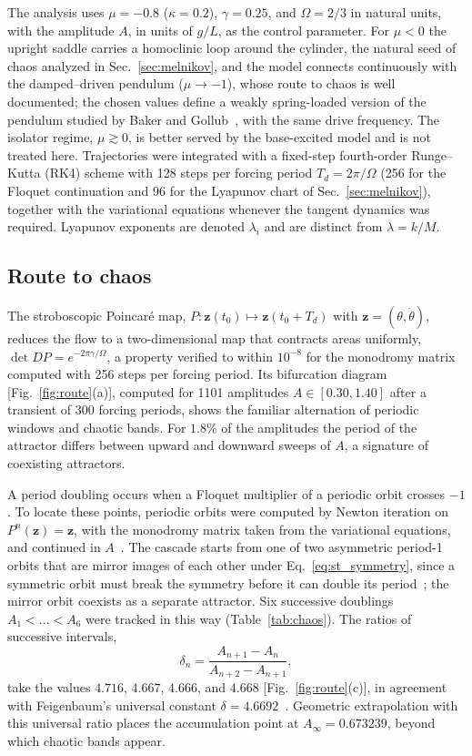 The analysis uses $\mu=-0.8$ ($\kappa=0.2$), $\gamma=0.25$, and $\Omega=2/3$ in natural units, with the amplitude $A$, in units of $g/L$, as the control parameter. For $\mu<0$ the upright saddle carries a homoclinic loop around the cylinder, the natural seed of chaos analyzed in Sec.~\ref{sec:melnikov}, and the model connects continuously with the damped--driven pendulum ($\mu\to-1$), whose route to chaos is well documented; the chosen values define a weakly spring-loaded version of the pendulum studied by Baker and Gollub~\cite{BakerGollub1996}, with the same drive frequency. The isolator regime, $\mu\gtrsim0$, is better served by the base-excited model and is not treated here. Trajectories were integrated with a fixed-step fourth-order Runge--Kutta (RK4) scheme with 128 steps per forcing period $T_d=2\pi/\Omega$ (256 for the Floquet continuation and 96 for the Lyapunov chart of Sec.~\ref{sec:melnikov}), together with the variational equations whenever the tangent dynamics was required. Lyapunov exponents are denoted $\lambda_i$ and are distinct from $\lambda=k/M$.

\subsection{Route to chaos}\label{sec:route}

The stroboscopic Poincar\'e map, $P:\mathbf z(t_0)\mapsto\mathbf z(t_0+T_d)$ with $\mathbf z=(\theta,\dot\theta)$, reduces the flow to a two-dimensional map that contracts areas uniformly, $\det DP=e^{-2\pi\gamma/\Omega}$, a property verified to within $10^{-8}$ for the monodromy matrix computed with 256 steps per forcing period. Its bifurcation diagram [Fig.~\ref{fig:route}(a)], computed for 1101 amplitudes $A\in[0.30,1.40]$ after a transient of 300 forcing periods, shows the familiar alternation of periodic windows and chaotic bands. For $1.8\%$ of the amplitudes the period of the attractor differs between upward and downward sweeps of $A$, a signature of coexisting attractors.

A period doubling occurs when a Floquet multiplier of a periodic orbit crosses $-1$. To locate these points, periodic orbits were computed by Newton iteration on $P^{n}(\mathbf z)=\mathbf z$, with the monodromy matrix taken from the variational equations, and continued in $A$~\cite{ParkerChua1989,Kuznetsov2004}. The cascade starts from one of two asymmetric period-1 orbits that are mirror images of each other under Eq.~\eqref{eq:st_symmetry}, since a symmetric orbit must break the symmetry before it can double its period~\cite{SwiftWiesenfeld1984}; the mirror orbit coexists as a separate attractor. Six successive doublings $A_1<\dots<A_6$ were tracked in this way (Table~\ref{tab:chaos}). The ratios of successive intervals,
\begin{equation}
\delta_n = \frac{A_{n+1}-A_{n}}{A_{n+2}-A_{n+1}},
\label{eq:feigenbaum}
\end{equation}
take the values $4.716$, $4.667$, $4.666$, and $4.668$ [Fig.~\ref{fig:route}(c)], in agreement with Feigenbaum's universal constant $\delta=4.6692$~\cite{Feigenbaum1978}. Geometric extrapolation with this universal ratio places the accumulation point at $A_\infty=0.673239$, beyond which chaotic bands appear.

